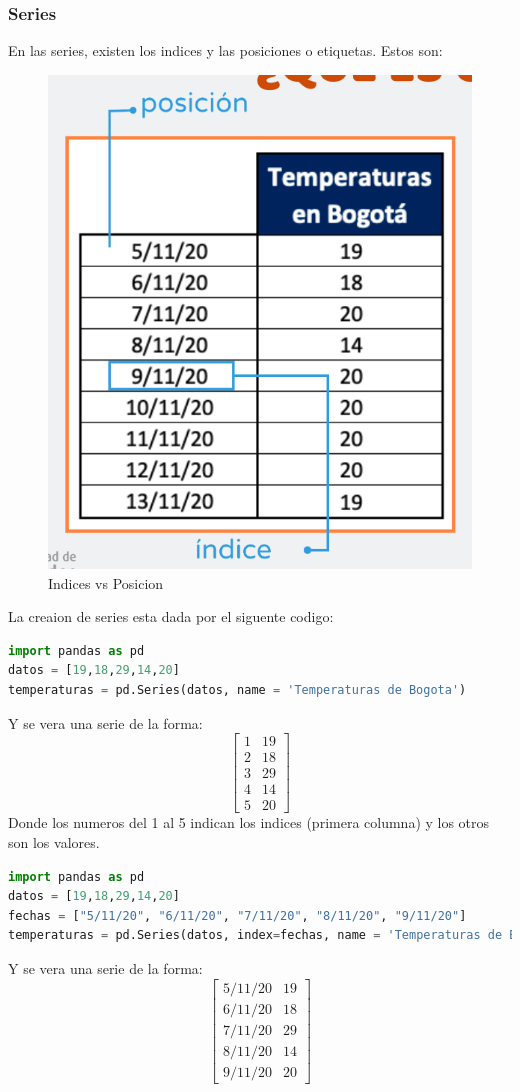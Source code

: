\documentclass{article}
\begin{document}
\subsubsection{Series}
En las series, existen los indices y las posiciones o etiquetas. Estos son: 
\begin{figure}[H]
    \centering
    \includegraphics[width=.5\linewidth]{IndicevsPosicion.png}
    \caption{Indices vs Posicion}
    \label{fig:enter-label}
\end{figure}
La creaion de series esta dada por el siguente codigo:
\begin{lstlisting}[language=Python, caption= Creacion de una Serie]
import pandas as pd
datos = [19,18,29,14,20]
temperaturas = pd.Series(datos, name = 'Temperaturas de Bogota')
\end{lstlisting}
Y se vera una serie de la forma:
\[
\begin{bmatrix}
    1 & 19 \\
    2 & 18 \\
    3 & 29 \\
    4 & 14 \\
    5 & 20
\end{bmatrix}
\]
Donde los numeros del 1 al 5 indican los indices (primera columna) y los otros son los valores. 
\begin{lstlisting}[language=Python, caption= Creacion de una Serie con indices]
import pandas as pd
datos = [19,18,29,14,20]
fechas = ["5/11/20", "6/11/20", "7/11/20", "8/11/20", "9/11/20"]
temperaturas = pd.Series(datos, index=fechas, name = 'Temperaturas de Bogota')
\end{lstlisting}
Y se vera una serie de la forma:
\[
\begin{bmatrix}
    5/11/20 & 19 \\
    6/11/20 & 18 \\
    7/11/20 & 29 \\
    8/11/20 & 14 \\
    9/11/20 & 20
\end{bmatrix}
\]
\end{document}
